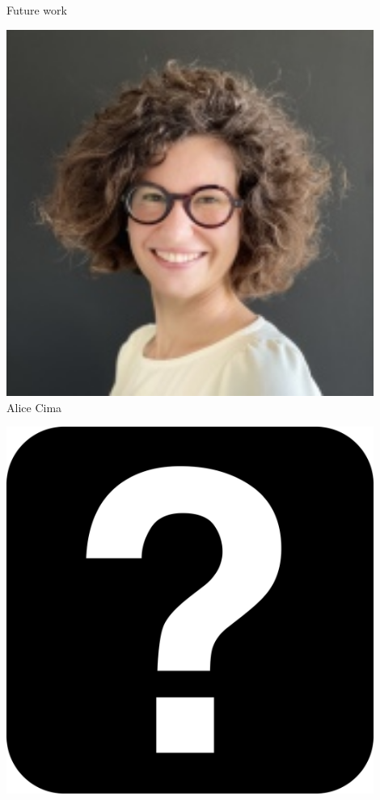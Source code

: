 \begin{frame}{Future work}
\begin{minipage}[t]{0.24\textwidth}
    \centering
    \includegraphics[width=0.9\textwidth]{static_figures/alice.jpg}\\
    Alice Cima
\end{minipage}
\begin{minipage}[t]{0.24\textwidth}
    \centering
    \includegraphics[width=0.9\textwidth]{static_figures/question-mark.jpg}\\

\end{minipage}
\end{frame}

